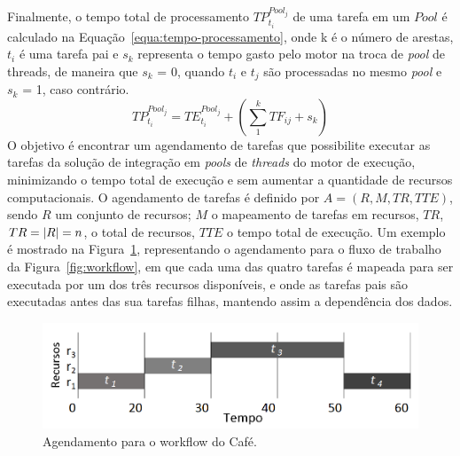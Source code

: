 \documentclass[sigconf]{acmart}
\begin{document}
 Finalmente, o tempo total de processamento $TP_{{t_i}}^{Poo{l_j}}$ de uma tarefa em um $Pool$ é calculado na Equação~\ref{equa:tempo-processamento}, onde k é o número de arestas, $t_i$ é uma tarefa pai e $s_k$ representa o tempo gasto pelo motor na troca de \emph{pool} de threads, de maneira que $s_k$ = 0, quando $t_i$ e $t_j$ são processadas no mesmo \emph{pool} e  $s_k$ = 1, caso contrário.
 \begin{equation}
 TP_{{t_i}}^{Poo{l_j}} = TE_{{t_i}}^{Poo{l_j}} + (\sum\limits_1^k {T{F_{ij}} + {s_k}} )
 \label{equa:tempo-processamento}
 \end{equation}
 O objetivo é encontrar um agendamento de tarefas que possibilite executar as tarefas da solução de integração em \emph{pools} de \emph{threads} do motor de execução, minimizando o tempo total de execução e sem aumentar a quantidade de recursos computacionais. O agendamento de tarefas é definido por $A= (R, M, TR, TTE)$, sendo $R$ um conjunto de recursos; $M$ o mapeamento de tarefas em recursos, $TR$, $TR=\arrowvert R\arrowvert =n$, o total de recursos, $TTE$ o tempo total de execução. Um exemplo é mostrado na Figura~\ref{fig:grafico-mapeamento}, representando o agendamento para o fluxo de trabalho da Figura~\ref{fig:workflow}, em que cada uma das quatro tarefas é mapeada para ser executada por um dos três recursos disponíveis, e onde as tarefas pais são executadas antes das sua tarefas filhas, mantendo assim a dependência dos dados.
 \begin{figure}[htb]
 	\centering
 	\includegraphics[scale=0.2]{./figs/grafico-mapeamento.png}
 	\caption{Agendamento para o workflow do Café.}
 	\label{fig:grafico-mapeamento}
 \end{figure}
\end{document}
